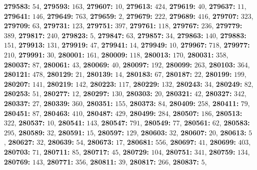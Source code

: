 \textsf{\bfseries 279583:} $54$, \textsf{\bfseries 279593:} $163$, \textsf{\bfseries 279607:} $10$, \textsf{\bfseries 279613:} $424$, \textsf{\bfseries 279619:} $40$, \textsf{\bfseries 279637:} $11$, \textsf{\bfseries 279641:} $146$, \textsf{\bfseries 279649:} $763$, \textsf{\bfseries 279659:} $2$, \textsf{\bfseries 279679:} $222$, \textsf{\bfseries 279689:} $416$, \textsf{\bfseries 279707:} $323$, \textsf{\bfseries 279709:} $63$, \textsf{\bfseries 279731:} $123$, \textsf{\bfseries 279751:} $397$, \textsf{\bfseries 279761:} $118$, \textsf{\bfseries 279767:} $236$, \textsf{\bfseries 279779:} $389$, \textsf{\bfseries 279817:} $240$, \textsf{\bfseries 279823:} $5$, \textsf{\bfseries 279847:} $63$, \textsf{\bfseries 279857:} $34$, \textsf{\bfseries 279863:} $140$, \textsf{\bfseries 279883:} $151$, \textsf{\bfseries 279913:} $131$, \textsf{\bfseries 279919:} $47$, \textsf{\bfseries 279941:} $14$, \textsf{\bfseries 279949:} $10$, \textsf{\bfseries 279967:} $718$, \textsf{\bfseries 279977:} $210$, \textsf{\bfseries 279991:} $30$, \textsf{\bfseries 280001:} $161$, \textsf{\bfseries 280009:} $118$, \textsf{\bfseries 280013:} $170$, \textsf{\bfseries 280031:} $358$, \textsf{\bfseries 280037:} $87$, \textsf{\bfseries 280061:} $43$, \textsf{\bfseries 280069:} $40$, \textsf{\bfseries 280097:} $192$, \textsf{\bfseries 280099:} $263$, \textsf{\bfseries 280103:} $364$, \textsf{\bfseries 280121:} $478$, \textsf{\bfseries 280129:} $21$, \textsf{\bfseries 280139:} $14$, \textsf{\bfseries 280183:} $67$, \textsf{\bfseries 280187:} $22$, \textsf{\bfseries 280199:} $199$, \textsf{\bfseries 280207:} $141$, \textsf{\bfseries 280219:} $142$, \textsf{\bfseries 280223:} $117$, \textsf{\bfseries 280229:} $132$, \textsf{\bfseries 280243:} $34$, \textsf{\bfseries 280249:} $82$, \textsf{\bfseries 280253:} $51$, \textsf{\bfseries 280277:} $12$, \textsf{\bfseries 280297:} $130$, \textsf{\bfseries 280303:} $20$, \textsf{\bfseries 280321:} $42$, \textsf{\bfseries 280327:} $342$, \textsf{\bfseries 280337:} $27$, \textsf{\bfseries 280339:} $360$, \textsf{\bfseries 280351:} $155$, \textsf{\bfseries 280373:} $84$, \textsf{\bfseries 280409:} $258$, \textsf{\bfseries 280411:} $79$, \textsf{\bfseries 280451:} $87$, \textsf{\bfseries 280463:} $410$, \textsf{\bfseries 280487:} $429$, \textsf{\bfseries 280499:} $284$, \textsf{\bfseries 280507:} $186$, \textsf{\bfseries 280513:} $322$, \textsf{\bfseries 280537:} $10$, \textsf{\bfseries 280541:} $143$, \textsf{\bfseries 280547:} $791$, \textsf{\bfseries 280549:} $77$, \textsf{\bfseries 280561:} $62$, \textsf{\bfseries 280583:} $295$, \textsf{\bfseries 280589:} $32$, \textsf{\bfseries 280591:} $15$, \textsf{\bfseries 280597:} $129$, \textsf{\bfseries 280603:} $32$, \textsf{\bfseries 280607:} $20$, \textsf{\bfseries 280613:} $5$, \textsf{\bfseries 280627:} $32$, \textsf{\bfseries 280639:} $54$, \textsf{\bfseries 280673:} $17$, \textsf{\bfseries 280681:} $556$, \textsf{\bfseries 280697:} $41$, \textsf{\bfseries 280699:} $403$, \textsf{\bfseries 280703:} $71$, \textsf{\bfseries 280711:} $85$, \textsf{\bfseries 280717:} $45$, \textsf{\bfseries 280729:} $104$, \textsf{\bfseries 280751:} $341$, \textsf{\bfseries 280759:} $134$, \textsf{\bfseries 280769:} $143$, \textsf{\bfseries 280771:} $356$, \textsf{\bfseries 280811:} $39$, \textsf{\bfseries 280817:} $266$, \textsf{\bfseries 280837:} $5$, 

